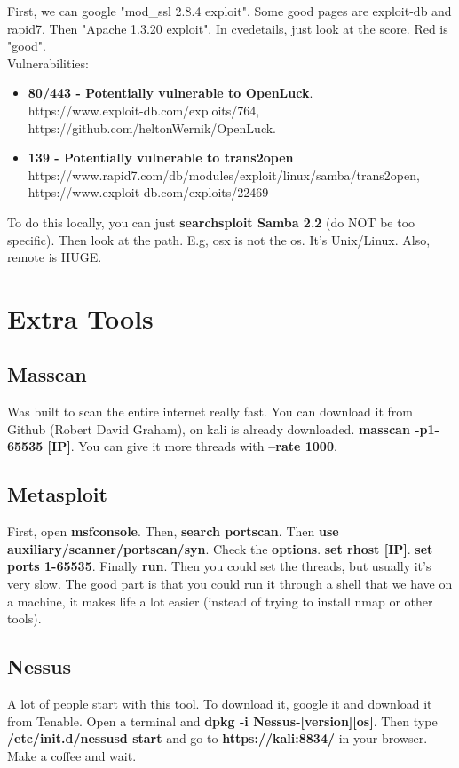 \documentclass[11pt,a4paper]{article}
\begin{document}
First, we can google "mod\_ssl 2.8.4 exploit". Some good pages are exploit-db and rapid7. Then "Apache 1.3.20 exploit". In cvedetails, just look at the score. Red is "good".\\

\newpage
Vulnerabilities:
\begin{itemize}
\item \textbf{80/443 - Potentially vulnerable to OpenLuck}. \\https://www.exploit-db.com/exploits/764,\\https://github.com/heltonWernik/OpenLuck.
\item \textbf{139 - Potentially vulnerable to trans2open}\\ https://www.rapid7.com/db/modules/exploit/linux/samba/trans2open, \\https://www.exploit-db.com/exploits/22469
\end{itemize}

\noindent \dotfill

To do this locally, you can just \textbf{searchsploit Samba 2.2} (do NOT be too specific). Then look at the path. E.g, osx is not the os. It's Unix/Linux. Also, remote is HUGE.

\section{Extra Tools}
\subsection{Masscan}
Was built to scan the entire internet really fast. You can download it from Github (Robert David Graham), on kali is already downloaded. \textbf{masscan -p1-65535 [IP]}. You can give it more threads with \textbf{--rate 1000}.

\subsection{Metasploit}
First, open \textbf{msfconsole}. Then, \textbf{search portscan}. Then \textbf{use auxiliary/scanner/portscan/syn}. Check the \textbf{options}. \textbf{set rhost [IP]}. \textbf{set ports 1-65535}. Finally \textbf{run}. Then you could set the threads, but usually it's very slow. The good part is that you could run it through a shell that we have on a machine, it makes life a lot easier (instead of trying to install nmap or other tools).

\subsection{Nessus}
A lot of people start with this tool. To download it, google it and download it from Tenable. Open a terminal and \textbf{dpkg -i Nessus-[version][os]}. Then type \textbf{/etc/init.d/nessusd start} and go to \textbf{https://kali:8834/} in your browser. Make a coffee and wait.\\
\end{document}
